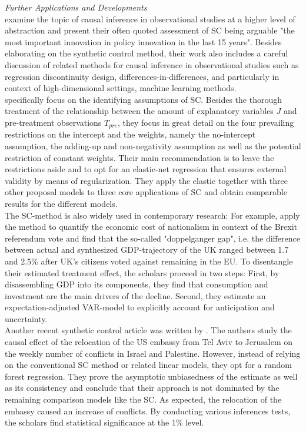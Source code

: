 \textit{Further Applications and Developments}\\
\cite{athey:2016} examine the topic of causal inference in observational studies at a higher level of abstraction and present their often quoted assessment of \ac{SC} being arguable "the most important innovation in policy innovation in the last 15 years". Besides elaborating on the synthetic control method, their work also includes a careful discussion of related methods for causal inference in observational studies such as regression discontinuity design, differences-in-differences, and particularly in context of high-dimensional settings, machine learning methods. \\
\cite{doudchenko:2016} specifically focus on the identifying assumptions of \ac{SC}. Besides the thorough treatment of the relationship between the amount of explanatory variables $J$ and pre-treatment observations $T_{pre}$, they focus in great detail on the four prevailing restrictions on the intercept and the weights, namely the no-intercept assumption, the adding-up and non-negativity assumption as well as the potential restriction of constant weights. Their main recommendation is to leave the restrictions aside and to opt for an elastic-net regression that ensures external validity by means of regularization. They apply the elastic together with three other proposal models to three core applications of \ac{SC} and obtain comparable results for the different models. \\
The \ac{SC}-method is also widely used in contemporary research: For example, \cite{born:2019} apply the method to quantify the economic cost of nationalism in context of the Brexit referendum vote and find that the so-called "doppelganger gap", i.e. the difference between actual and synthesized \ac{GDP}-trajectory of the \ac{UK} ranged between 1.7 and 2.5\% after \ac{UK}'s citizens voted against remaining in the EU. To disentangle their estimated treatment effect, the scholars proceed in two steps: First, by disassembling \ac{GDP} into its components, they find that consumption and investment are the main drivers of the decline. Second, they estimate an expectation-adjusted \ac{VAR}-model to explicitly account for anticipation and uncertainty. \\
Another recent synthetic control article was written by \cite{muhlbach:2019}. The authors study the causal effect of the relocation of the US embassy from Tel Aviv to Jerusalem on the weekly number of conflicts in Israel and Palestine. However, instead of relying on the conventional \ac{SC} method or related linear models, they opt for a random forest regression. They prove the asymptotic unbiasedness of the estimate as well as its consistency and conclude that their approach is not dominated by the remaining comparison models like the \ac{SC}. As expected, the relocation of the embassy caused an increase of conflicts. By conducting various inferences tests, the scholars find statistical significance at the 1\% level.\\
